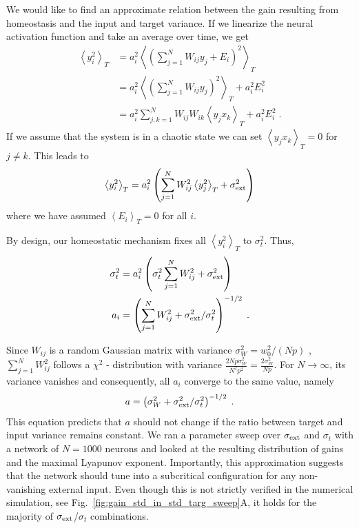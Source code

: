 \documentclass[10pt,a4paper]{article}
\newcommand{\avgt}[1]{\left< #1 \right>_T}
\begin{document}
We would like to find an approximate relation between the gain resulting from homeostasis and the input and target variance. If we linearize the neural activation function and take an average over time, we get
\begin{align}
	\avgt{y_i^2} &= a_i^2 \avgt{\left(\sum_{j=1}^{N} W_{ij} y_j + E_i\right)^2} \label{eq:time_avg_act_var}\\
	&= a_i^2 \avgt{\left( \sum_{j=1}^{N} W_{ij} y_j \right)^2} + a_i^2 E_i^2 \\
	&= a_i^2 \sum_{j,k=1}^{N} W_{ij}W_{ik} \avgt{y_j x_k} + a_i^2 E_i^2 \; .
\end{align}
If we assume that the system is in a chaotic state we can set $\avgt{y_j x_k}=0$ for $j\neq k$. This leads to
\begin{equation}
	\avgt{y_i^2} = a_i^2 \left( \sum_{j=1}^{N} W_{ij}^2 \avgt{y_j^2} + \sigma_{\rm ext}^2 \right)
\end{equation}
where we have assumed $\avgt{E_i} = 0$ for all $i$.

By design, our homeostatic mechanism fixes all $\avgt{y_i^2}$ to $\sigma_{t}^2$. Thus,
\begin{align}
	\sigma_{t}^2 &= a_i^2 \left( \sigma_{t}^2 \sum_{j=1}^{N} W_{ij}^2 + \sigma_{\rm ext}^2 \right) \\ 
	a_i &= \left(\sum_{j=1}^{N} W_{ij}^2 + \sigma_{\rm ext}^2 / \sigma_{t}^2\right)^{-1/2} \; .
\end{align}

Since $W_{ij}$ is a random Gaussian matrix with variance $\sigma_W^2 = w_0^2/\left( N p \right)$ , $\sum_{j=1}^{N} W_{ij}^2$ follows a $\chi^2$ - distribution with variance $\frac{2N p \sigma_{W}^2}{N^2 p^2} = \frac{2 \sigma_{W}^2}{N p}$. For $N \rightarrow \infty $, its variance vanishes and consequently, all $a_i$ converge to the same value, namely 
\begin{equation}
	a = \left(\sigma_{W}^2 + \sigma_{\rm ext}^2 / \sigma_{t}^2\right)^{-1/2} \; . \label{eq:gain_pred}
\end{equation}
This equation predicts that $a$ should not change if the ratio between target and input variance remains constant. We ran a parameter sweep over $\sigma_{\rm ext}$ and $\sigma_{t}$ with a network of $N = 1000$ neurons and looked at the resulting distribution of gains and the maximal Lyapunov exponent. Importantly, this approximation suggests that the network should tune into a subcritical configuration for any non-vanishing external input. Even though this is not strictly verified in the numerical simulation, see Fig.~\ref{fig:gain_std_in_std_targ_sweep}A, it holds for the majority of $ \sigma_{\rm ext}$/$\sigma_{t}$ combinations.
\end{document}
